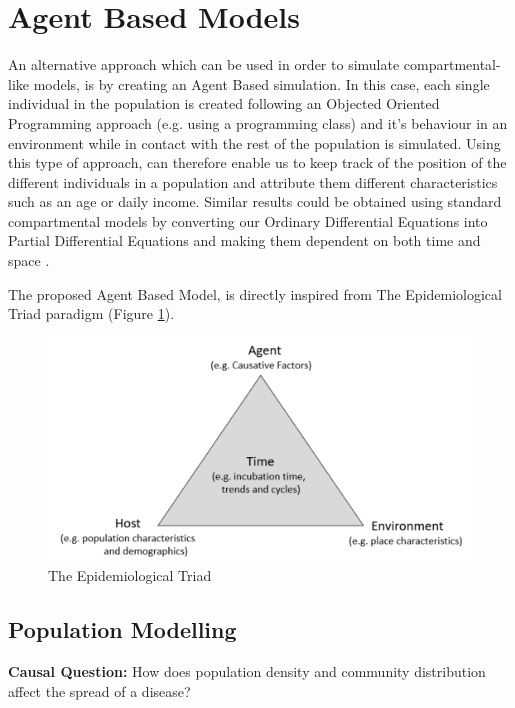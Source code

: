 \section{Agent Based Models}
\label{agent_smith}
An alternative approach which can be used in order to simulate compartmental-like models, is by creating an Agent Based simulation. In this case, each single individual in the population is created following an Objected Oriented Programming approach (e.g. using a programming class) and it's behaviour in an environment while in contact with the rest of the population is simulated. Using this type of approach, can therefore enable us to keep track of the position of the different individuals in a population and attribute them different characteristics such as an age or daily income. Similar results could be obtained using standard compartmental models by converting our Ordinary Differential Equations into Partial Differential Equations and making them dependent on both time and space \cite{pde}.

The proposed Agent Based Model, is directly inspired from The Epidemiological Triad paradigm (Figure \ref{triad}).

\begin{figure}[h]
\vspace{-0.2cm}
\centering
\includegraphics[scale = 0.5]{latex/images/model.pdf}
\caption{The Epidemiological Triad}
\label{triad}
\end{figure}

\subsection{Population Modelling}

\textbf{Causal Question:} How does population density and community distribution affect the spread of a disease?

